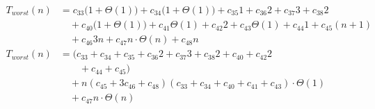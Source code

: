 \begin{subequations}
\label{eq:findlinesegments-5}
\begin{align}
\label{eq:findlinesegments-5-1}
T_{worst}(n)& =
c_{33}\bigl(1 + \Theta(1)\bigr)
+ c_{34}\bigl(1 + \Theta(1)\bigr)
+ c_{35}1
+ c_{36}2
+ c_{37}3
+ c_{38}2
\\
& \quad
+ c_{40}\bigl(1 + \Theta(1)\bigr)
+ c_{41}\Theta(1)
+ c_{42}2
+ c_{43}\Theta(1)
+ c_{44}1
+ c_{45}(n+1)
\nonumber \\
& \quad
+ c_{46}3n
+ c_{47}n \cdot \Theta(n)
+ c_{48}n
\nonumber \\
\label{eq:findlinesegments-5-2}
T_{worst}(n)& =
(c_{33} + c_{34} + c_{35} + c_{36}2 + c_{37}3 + c_{38}2 + c_{40} + c_{42}2
\\
& \quad \quad
 + c_{44} + c_{45})
\nonumber \\
& \quad
+ n(c_{45} + 3c_{46} + c_{48})
(c_{33} + c_{34} + c_{40} + c_{41} + c_{43}) \cdot \Theta(1)
\nonumber \\
& \quad
+ c_{47}n \cdot \Theta(n)
\nonumber%
\end{align}
\end{subequations}
